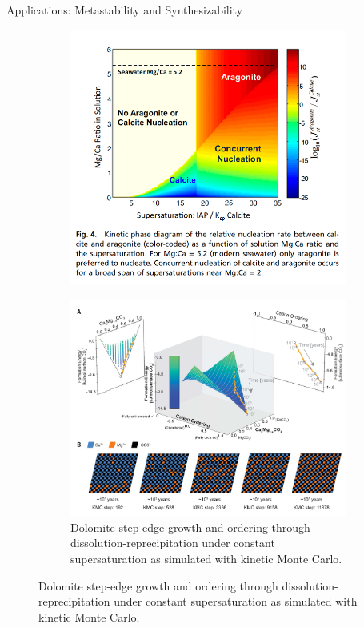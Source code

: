 \documentclass[aspectratio=169]{beamer}
\begin{document}
    \begin{frame}{Applications: Metastability and Synthesizability}

        \begin{figure}
            \centering
            \begin{subfigure}{0.45\textwidth}
                \centering
                \includegraphics[width=\linewidth]{lectures/figures/11_metastable.png}
                \caption{\cite{sunCorrectionSunNucleation2015}}
            \end{subfigure}
            \begin{subfigure}{0.45\textwidth}
                \centering
                \includegraphics[width=0.9\linewidth]{lectures/figures/11_dolomite.png}
                \caption{Dolomite step-edge growth and ordering through dissolution-reprecipitation under constant supersaturation as simulated with kinetic Monte Carlo.\cite{kimDissolutionEnablesDolomite2023}}
            \end{subfigure}
        \end{figure}

    \end{frame}
\end{document}
